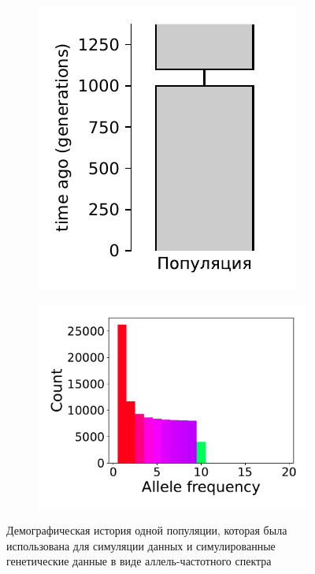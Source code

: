 \begin{figure}[ht]
    \centering
    \begin{subfigure}[b]{.33\textwidth}
    \includegraphics[width=\textwidth]{images_experiments/simulation_1/1pop/picture_1pop_ground_truth_grey.pdf}
    \caption{}
    \label{fig:part2:experiments:simulated_1:data_1}
    \end{subfigure}%
    \begin{subfigure}[b]{.5\textwidth}
    \includegraphics[width=\textwidth]{images_experiments/simulation_1/1pop/1d_plot.pdf}
    \caption{}
    \label{fig:part2:experiments:simulated_1:data_2}
    \end{subfigure}
    \caption{Демографическая история одной популяции, которая была использована для симуляции данных и симулированные генетические данные в виде аллель-частотного спектра}
    \label{fig:part2:experiments:simulated_1:data}
\end{figure}

